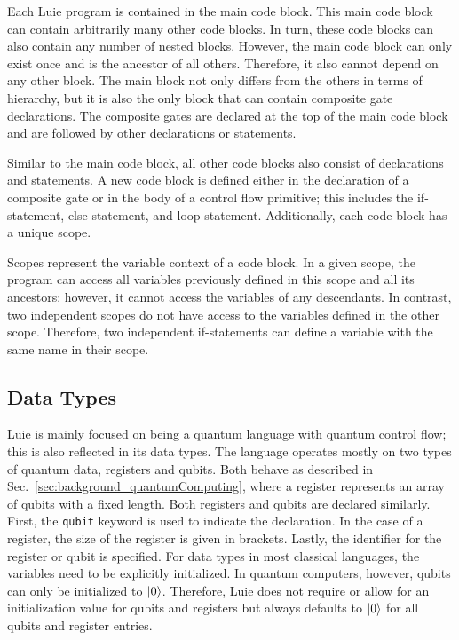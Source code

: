 Each Luie program is contained in the main code block. This main code block can contain arbitrarily many other code blocks. In turn, these code blocks can also contain any number of nested blocks. However, the main code block can only exist once and is the ancestor of all others. Therefore, it also cannot depend on any other block. The main block not only differs from the others in terms of hierarchy, but it is also the only block that can contain composite gate declarations. The composite gates are declared at the top of the main code block and are followed by other declarations or statements. 

Similar to the main code block, all other code blocks also consist of declarations and statements. A new code block is defined either in the declaration of a composite gate or in the body of a control flow primitive; this includes the if-statement, else-statement, and loop statement. Additionally, each code block has a unique scope.

Scopes represent the variable context of a code block. In a given scope, the program can access all variables previously defined in this scope and all its ancestors; however, it cannot access the variables of any descendants.
In contrast, two independent scopes do not have access to the variables defined in the other scope. Therefore, two independent if-statements can define a variable with the same name in their scope. 

\subsection{Data Types}
\label{sec:concept_dataTypes}
Luie is mainly focused on being a quantum language with quantum control flow; this is also reflected in its data types. The language operates mostly on two types of quantum data, registers and qubits. Both behave as described in Sec.~\ref{sec:background_quantumComputing}, where a register represents an array of qubits with a fixed length.
Both registers and qubits are declared similarly. First, the \texttt{qubit} keyword is used to indicate the declaration. In the case of a register, the size of the register is given in brackets. Lastly, the identifier for the register or qubit is specified. For data types in most classical languages, the variables need to be explicitly initialized. In quantum computers, however, qubits can only be initialized to $\ket{0}$. Therefore, Luie does not require or allow for an initialization value for qubits and registers but always defaults to $\ket{0}$ for all qubits and register entries.


